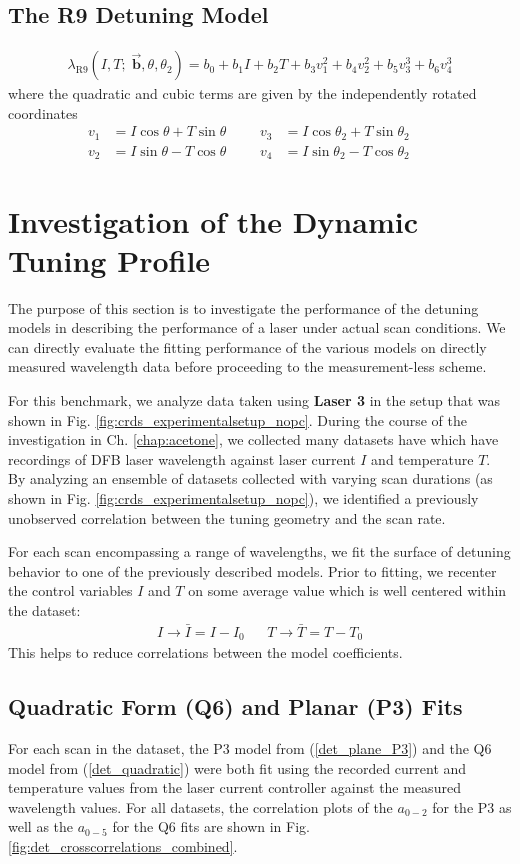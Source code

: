 \documentclass[8pt,a4paper]{report}
\begin{document}
	\subsection{The R9 Detuning Model}
	\begin{align} \label{det_model_R9}
		\lambda_\mathrm{R9}(I, T;\; \vec{\textbf{b}},\theta, \theta_2) = b_0 + b_1 I + b_2 T + b_3 v_1^2 + b_4 v_2^2 + b_5 v_3^3 + b_6 v_4^3
	\end{align}
	where the quadratic and cubic terms are given by the independently rotated coordinates
	\begin{align}
		v_1 &= I\cos\theta + T\sin\theta &&& v_3 &= I\cos\theta_2 + T\sin\theta_2 && \nonumber\\
		v_2 &= I\sin\theta - T\cos\theta &&& v_4 &= I\sin\theta_2 - T\cos\theta_2 &&
	\end{align}
	\section{Investigation of the Dynamic Tuning Profile}
	The purpose of this section is to investigate the performance of the detuning models in describing the performance of a laser under actual scan conditions. We can directly evaluate the fitting performance of the various models on directly measured wavelength data before proceeding to the measurement-less scheme.
	
	For this benchmark, we analyze data taken using \textbf{Laser 3} in the setup that was shown in Fig. \ref{fig:crds_experimentalsetup_nopc}. During the course of the investigation in Ch. \ref{chap:acetone}, we collected many datasets have which have recordings of DFB laser wavelength against laser current $I$ and temperature $T$. By analyzing an ensemble of datasets collected with varying scan durations (as shown in Fig. \ref{fig:crds_experimentalsetup_nopc}), we identified a previously unobserved correlation between the tuning geometry and the scan rate.
	
	For each scan encompassing a range of wavelengths, we fit the surface of detuning behavior to one of the previously described models. Prior to fitting, we recenter the control variables $I$ and $T$ on some average value which is well centered within the dataset:
	\begin{align}
		I \rightarrow \bar{I} =  I - I_0 && T \rightarrow \bar{T} =  T - T_0
	\end{align}
	This helps to reduce correlations between the model coefficients.
	
	\subsection{Quadratic Form (Q6) and Planar (P3) Fits}
	For each scan in the dataset, the P3 model from (\ref{det_plane_P3}) and the Q6 model from (\ref{det_quadratic}) were both fit using the recorded current and temperature values from the laser current controller against the measured wavelength values. For all datasets, the correlation plots of the $a_{0-2}$ for the P3 as well as the $a_{0-5}$ for the Q6 fits are shown in Fig. \ref{fig:det_crosscorrelations_combined}.
	
\end{document}
